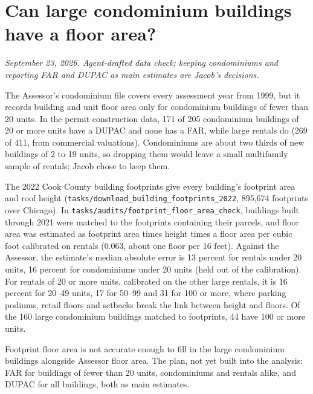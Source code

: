 \clearpage
\section*{Can large condominium buildings have a floor area?}
\textit{September 23, 2026. Agent-drafted data check; keeping condominiums and reporting FAR and DUPAC as main
estimates are Jacob's decisions.}

The Assessor's condominium file covers every assessment year from 1999, but it records building and unit floor area
only for condominium buildings of fewer than 20 units. In the permit construction data,
171 of 205 condominium buildings of 20 or more units have a DUPAC and none has a FAR, while large rentals do (269 of
411, from commercial valuations). Condominiums are about two thirds of new buildings of 2 to 19 units, so dropping
them would leave a small multifamily sample of rentals; Jacob chose to keep them.

The 2022 Cook County building footprints give every building's footprint area and roof height
(\texttt{tasks/download\_building\_footprints\_2022}, 895,674 footprints over Chicago). In
\texttt{tasks/audits/footprint\_floor\_area\_check}, buildings built through 2021 were matched to the footprints
containing their parcels, and floor area was estimated as footprint area times height times a floor area per cubic
foot calibrated on rentals (0.063, about one floor per 16 feet). Against the Assessor, the estimate's median absolute
error is 13 percent for rentals under 20 units, 16 percent for condominiums under 20 units (held out of the
calibration). For rentals of 20 or more units, calibrated on the other large rentals, it is 16 percent for 20--49
units, 17 for 50--99 and 31 for 100 or more, where parking podiums, retail floors and setbacks break the link between
height and floors. Of the 160 large condominium buildings matched to footprints, 44 have 100 or more units.

Footprint floor area is not accurate enough to fill in the large condominium buildings alongside Assessor floor
area. The plan, not yet built into the analysis: FAR for buildings of fewer than 20 units, condominiums and rentals
alike, and DUPAC for all buildings, both as main estimates.

